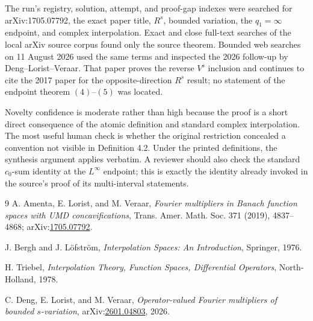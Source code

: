 \documentclass[10pt]{article}
\newcommand{\1}{\mathbf 1}
\begin{document}
The run's registry, solution, attempt, and proof-gap indexes were searched
for arXiv:1705.07792, the exact paper title, \(R^s\), bounded variation,
the \(q_1=\infty\) endpoint, and complex interpolation.  Exact and close
full-text searches of the local arXiv source corpus found only the source
theorem.  Bounded web searches on 11 August 2026 used the same terms and
inspected the 2026 follow-up by Deng--Lorist--Veraar.  That paper proves the
reverse \(V^s\) inclusion and continues to cite the 2017 paper for the
opposite-direction \(R^s\) result; no statement of the endpoint theorem
\((4)\)--\((5)\) was located.

Novelty confidence is moderate rather than high because the proof is a
short direct consequence of the atomic definition and standard complex
interpolation.  The most useful human check is whether the original
restriction concealed a convention not visible in Definition 4.2.  Under
the printed definitions, the synthesis argument applies verbatim.  A
reviewer should also check the standard \(c_0\)-sum identity at the
\(L^\infty\) endpoint; this is exactly the identity already invoked in the
source's proof of its multi-interval statements.

{\small
\begin{thebibliography}{9}
A. Amenta, E. Lorist, and M. Veraar,
\emph{Fourier multipliers in Banach function spaces with UMD
concavifications}, Trans. Amer. Math. Soc. 371 (2019), 4837--4868;
arXiv:\href{https://arxiv.org/abs/1705.07792}{1705.07792}.

J. Bergh and J. L\"ofstr\"om,
\emph{Interpolation Spaces: An Introduction}, Springer, 1976.

H. Triebel,
\emph{Interpolation Theory, Function Spaces, Differential Operators},
North-Holland, 1978.

C. Deng, E. Lorist, and M. Veraar,
\emph{Operator-valued Fourier multipliers of bounded \(s\)-variation},
arXiv:\href{https://arxiv.org/abs/2601.04803}{2601.04803}, 2026.
\end{thebibliography}
}
\end{document}
